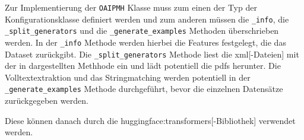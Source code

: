 Zur Implementierung der \texttt{OAIPMH} Klasse
muss zum einen der Typ der Konfigurationsklasse definiert werden
und zum anderen müssen die \texttt{_info},
die \texttt{_split_generators}
und die \texttt{_generate_examples}
Methoden überschrieben werden.
In der \texttt{_info} Methode werden hierbei die Features festgelegt,
die das Dataset zurückgibt.
Die \texttt{_split_generators} Methode
liest die \gls{xml}[-Dateien]
mit der in  dargestellten Methhode
ein
und lädt potentiell die \glspl{pdf} herunter.
Die Volltextextraktion und das Stringmatching
werden potentiell in der \texttt{_generate_examples} Methode durchgeführt,
bevor die einzelnen Datensätze zurückgegeben werden.

Diese können danach durch die \gls{huggingface:transformers}[-Bibliothek] verwendet werden.
